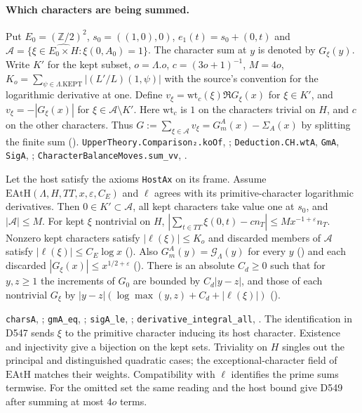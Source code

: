 \paragraph{Which characters are being summed.}
Put $E_0=(\mathbb Z/2)^2$, $s_0=((1,0),0)$,
$e_1(t)=s_0+(0,t)$ and
$\mathcal A=\{\xi\in\widehat{E_0\times H}:\xi(0,A_0)=1\}$.
The character sum at $y$ is denoted by $G_\xi(y)$.
Write $K'$ for the kept subset, $o=\Lambda.o$, $c=(3o+1)^{-1}$, $M=4o$,
$K_o=\sum_{\psi\in\Lambda.\mathrm{KEPT}}|(L'/L)(1,\psi)|$
with the source's convention for the logarithmic derivative at one.
Define $v_\xi=\mathrm{wt}_c(\xi)\Re G_\xi(x)$ for $\xi\in K'$,
and $v_\xi=-|G_\xi(x)|$ for $\xi\in\mathcal A\setminus K'$.
Here $\mathrm{wt}_c$ is $1$ on the characters trivial on $H$, and $c$
on the other characters. Thus
$G:=\sum_{\xi\in\mathcal A}v_\xi=G_m^A(x)-\Sigma_A(x)$
by splitting the finite sum ().
\nolinkurl{UpperTheory.Comparison₂.koOf}, ;
\nolinkurl{Deduction.CH.wtA}, \nolinkurl{GmA}, \nolinkurl{SigA},
;
\nolinkurl{CharacterBalanceMoves.sum_vv}, .

\begin{formalstatement}\label{r23:charinputs}
Let the host satisfy the axioms \nolinkurl{HostAx} on its frame. Assume $\mathrm{EAtH}(\Lambda,H,TT,x,\varepsilon,C_E)$
and $\ell$ agrees with its primitive-character logarithmic derivatives.
Then $0\in K'\subset\mathcal A$, all kept characters take value one at
$s_0$, and $|\mathcal A|\le M$. For kept $\xi$ nontrivial on $H$,
$|\sum_{t\in TT}\xi(0,t)-c n_T|\le M x^{-1+\varepsilon}n_T$.
Nonzero kept characters satisfy $|\ell(\xi)|\le K_o$ and discarded
members of $\mathcal A$ satisfy $|\ell(\xi)|\le C_E\log x$
(). Also $G_m^A(y)=\mathcal G_\Lambda(y)$ for every $y$
() and each discarded $|G_\xi(x)|\le x^{1/2+\varepsilon}$
(). There is an absolute $C_d\ge0$ such that for $y,z\ge1$
the increments of $G_0$ are bounded by $C_d|y-z|$, and those of each
nontrivial $G_\xi$ by
$|y-z|(\log\max(y,z)+C_d+|\ell(\xi)|)$ ().
\end{formalstatement}
\noindent\nolinkurl{charsA}, ;
\nolinkurl{gmA_eq}, ;
\nolinkurl{sigA_le}, ;
\nolinkurl{derivative_integral_all}, .
The identification in D547 sends $\xi$ to the primitive character inducing
its host character. Existence and injectivity give a bijection on the kept
sets. Triviality on $H$ singles out the principal and distinguished quadratic
cases; the exceptional-character field of $\mathrm{EAtH}$ matches their
weights. Compatibility with $\ell$ identifies the prime sums termwise.
For the omitted set the same reading and the host bound give D549 after
summing at most $4o$ terms.

